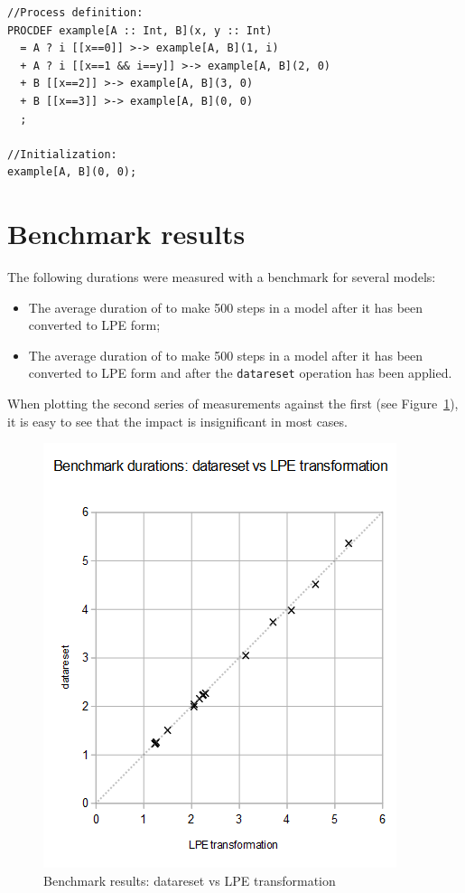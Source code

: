 \begin{lstlisting}
//Process definition:
PROCDEF example[A :: Int, B](x, y :: Int)
  = A ? i [[x==0]] >-> example[A, B](1, i)
  + A ? i [[x==1 && i==y]] >-> example[A, B](2, 0)
  + B [[x==2]] >-> example[A, B](3, 0)
  + B [[x==3]] >-> example[A, B](0, 0)
  ;

//Initialization:
example[A, B](0, 0);
\end{lstlisting}

\section{Benchmark results}

The following durations were measured with a benchmark for several models:
\begin{itemize}
\item The average duration of \txs{} to make 500 steps in a model after it has been converted to LPE form;
\item The average duration of \txs{} to make 500 steps in a model after it has been converted to LPE form and after the \texttt{datareset} operation has been applied.
\end{itemize}

When plotting the second series of measurements against the first (see Figure~\ref{datareset-vs-lpe-only:fig}), it is easy to see that the impact is insignificant in most cases.

\begin{figure}[!ht]
\begin{center}
\includegraphics[width=0.7\linewidth]{charts/datareset-vs-lpe-only}
\caption{Benchmark results: datareset vs LPE transformation}
\label{datareset-vs-lpe-only:fig}
\end{center}
\end{figure}


